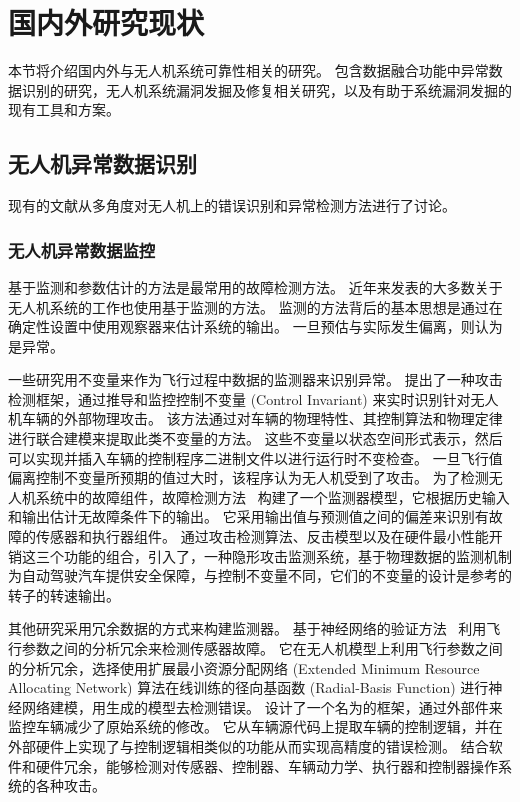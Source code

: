 

\section{国内外研究现状}
本节将介绍国内外与无人机系统可靠性相关的研究。
包含数据融合功能中异常数据识别的研究，无人机系统漏洞发掘及修复相关研究，以及有助于系统漏洞发掘的现有工具和方案。


\subsection{无人机异常数据识别}
现有的文献从多角度对无人机上的错误识别和异常检测方法进行了讨论。

\subsubsection{无人机异常数据监控}
基于监测和参数估计的方法是最常用的故障检测方法。 
近年来发表的大多数关于无人机系统的工作也使用基于监测的方法。
监测的方法背后的基本思想是通过在确定性设置中使用观察器来估计系统的输出。
一旦预估与实际发生偏离，则认为是异常。

一些研究用不变量来作为飞行过程中数据的监测器来识别异常。
\citet{choi2018detecting}提出了一种攻击检测框架，通过推导和监控控制不变量 (Control Invariant) 来实时识别针对无人机车辆的外部物理攻击。
该方法通过对车辆的物理特性、其控制算法和物理定律进行联合建模来提取此类不变量的方法。
这些不变量以状态空间形式表示，然后可以实现并插入车辆的控制程序二进制文件以进行运行时不变检查。
一旦飞行值偏离控制不变量所预期的值过大时，该程序认为无人机受到了攻击。
为了检测无人机系统中的故障组件，故障检测方法~\cite{heredia2008sensor} 构建了一个监测器模型，它根据历史输入和输出估计无故障条件下的输出。
它采用输出值与预测值之间的偏差来识别有故障的传感器和执行器组件。
\citet{quinonez2020savior}通过攻击检测算法、反击模型以及在硬件最小性能开销这三个功能的组合，引入了，一种隐形攻击监测系统，基于物理数据的监测机制为自动驾驶汽车提供安全保障，与控制不变量不同，它们的不变量的设计是参考的转子的转速输出。

其他研究采用冗余数据的方式来构建监测器。
基于神经网络的验证方法~\cite{samy2008neural} 利用飞行参数之间的分析冗余来检测传感器故障。
它在无人机模型上利用飞行参数之间的分析冗余，选择使用扩展最小资源分配网络 (Extended Minimum Resource Allocating Network) 算法在线训练的径向基函数 (Radial-Basis Function) 进行神经网络建模，用生成的模型去检测错误。
\citet{fei2018cross} 设计了一个名为的框架，通过外部件来监控车辆减少了原始系统的修改。
它从车辆源代码上提取车辆的控制逻辑，并在外部硬件上实现了与控制逻辑相类似的功能从而实现高精度的错误检测。 
结合软件和硬件冗余，能够检测对传感器、控制器、车辆动力学、执行器和控制器操作系统的各种攻击。

